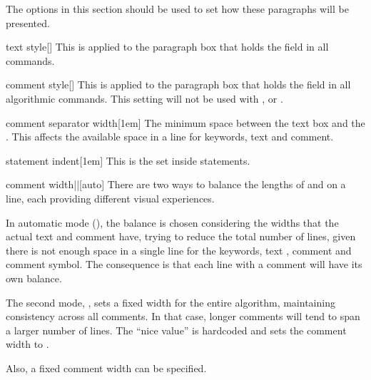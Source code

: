 \documentclass[a4paper, 11pt]{article}
\begin{document}
\medskip
The options in this section should be used to set how these paragraphs will be presented.

\begin{option}{text style}{}[]
    This  is applied to the paragraph box that holds the  field in all commands.
\end{option}

\begin{option}{comment style}{}[]
    This  is applied to the paragraph box that holds the  field in all algorithmic commands. This setting will not be used with ,  or .
\end{option}

\begin{option}{comment separator width}{}[1em]
    The minimum space between the text box and the . This affects the available space in a line for keywords, text and comment.
\end{option}

\begin{option}{statement indent}{}[1em]
    This is the  set inside  statements.
\end{option}

\begin{option}{comment width}{||}[auto]
    There are two ways to balance the lengths of  and  on a line, each providing different visual experiences.

    In automatic mode (), the balance is chosen considering the widths that the actual text and comment have, trying to reduce the total number of lines, given there is not enough space in a single line for the keywords, text , comment and comment symbol. The consequence is that each line with a comment will have its own balance.

    The second mode, , sets a fixed width for the entire algorithm, maintaining consistency across all comments. In that case, longer comments will tend to span a larger number of lines. The ``nice value'' is hardcoded and sets the comment width to .

    Also, a fixed comment width can be specified.
\end{option}
\end{document}
